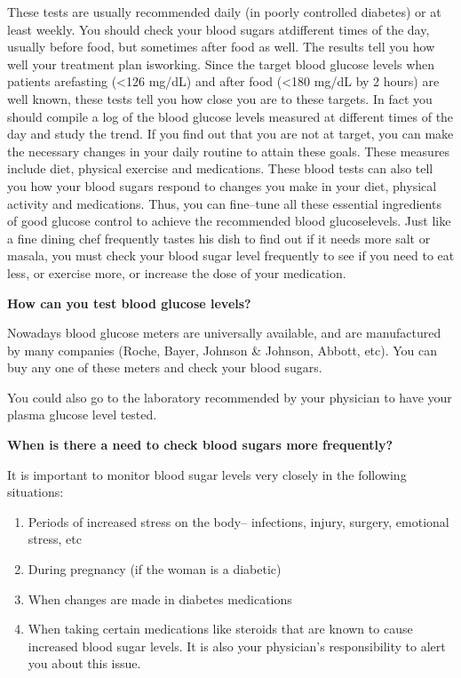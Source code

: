 These tests are usually recommended daily (in poorly controlled diabetes) or at least weekly. You should check your blood sugars at\break different times of the day, usually before food, but sometimes after food as well. The results tell you how well your treatment plan is\break working. Since the target blood glucose levels when patients are\break fasting (\textless  126 mg/dL) and after food (\textless  180 mg/dL by 2 hours) are well known, these tests tell you how close you are to these targets. In fact you should compile a log of the blood glucose levels measured at diffe\-rent times of the day and study the trend. If you find out that you are not at target, you can make the necessary changes in your daily routine to attain these goals. These measures include diet, physical exercise and medications. These blood tests can also tell you how your blood sugars respond to changes you make in your diet, physical activity and medications. Thus, you can fine–tune all these essential ingredients of good glucose control to achieve the recommended blood glucose\break levels. Just like a fine dining chef frequently tastes his dish to find out if it needs more salt or masala, you must check your blood sugar level frequently to see if you need to eat less, or exercise more, or increase the dose of your medication.

\noindent\textbf{How can you test blood glucose levels?}

Nowadays blood glucose meters are universally available, and are manufactured by many companies (Roche, Bayer, Johnson \& Johnson, Abbott, etc). You can buy any one of these meters and check your blood sugars.

You could also go to the laboratory recommended by your physician to have your plasma glucose level tested.

\noindent\textbf{When is there a need to check blood sugars more frequently?}

It is important to monitor blood sugar levels very closely in the following situations:

\vspace{-\topsep}
\begin{enumerate}[•]
\itemsep=0pt
\item Periods of increased stress on the body– infections, injury, surgery, emotional stress, etc
\item During pregnancy (if the woman is a diabetic)
\item When changes are made in diabetes medications
\item When taking certain medications like steroids that are known to cause increased blood sugar levels. It is also your physician’s responsibility to alert you about this issue.
\end{enumerate}
\vspace{-\topsep}

